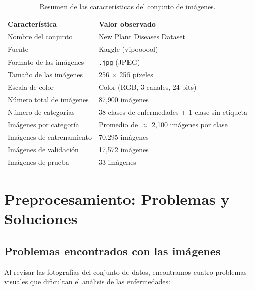 \documentclass[11pt,a4paper]{article}
\begin{document}
\begin{table}[H]
    \centering
    \renewcommand{\arraystretch}{1.3}
    \begin{tabular}{@{}ll@{}}
        \toprule
        \textbf{Característica} & \textbf{Valor observado} \\ \midrule
        Nombre del conjunto & New Plant Diseases Dataset \\
        Fuente & Kaggle (vipoooool) \\
        Formato de las imágenes & \texttt{.jpg} (JPEG) \\
        Tamaño de las imágenes & 256 $\times$ 256 píxeles \\
        Escala de color & Color (RGB, 3 canales, 24 bits) \\
        Número total de imágenes & 87,900 imágenes \\
        Número de categorías & 38 clases de enfermedades + 1 clase sin etiqueta \\
        Imágenes por categoría & Promedio de $\approx$ 2,100 imágenes por clase \\
        Imágenes de entrenamiento & 70,295 imágenes \\
        Imágenes de validación & 17,572 imágenes \\
        Imágenes de prueba & 33 imágenes \\ \bottomrule
    \end{tabular}
    \caption{Resumen de las características del conjunto de imágenes.}
    \label{tab:dataset_stats}
\end{table}

\section{Preprocesamiento: Problemas y Soluciones}

\subsection{Problemas encontrados con las imágenes}

Al revisar las fotografías del conjunto de datos, encontramos cuatro problemas visuales
que dificultan el análisis de las enfermedades:
\end{document}
